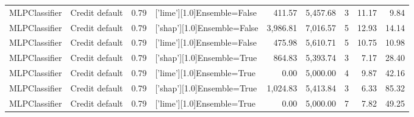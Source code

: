 \begin{tabular}{llrlrrlrr}
MLPClassifier & Credit default &      0.79 & ['lime'][1.0]Ensemble=False &     411.57 &                 5,457.68 &               3 &              11.17 &     9.84 \\
MLPClassifier & Credit default &      0.79 & ['shap'][1.0]Ensemble=False &   3,986.81 &                 7,016.57 &               5 &              12.93 &    14.14 \\
MLPClassifier & Credit default &      0.79 & ['lime'][1.0]Ensemble=False &     475.98 &                 5,610.71 &               5 &              10.75 &    10.98 \\
MLPClassifier & Credit default &      0.79 &  ['shap'][1.0]Ensemble=True &     864.83 &                 5,393.74 &               3 &               7.17 &    28.40 \\
MLPClassifier & Credit default &      0.79 &  ['lime'][1.0]Ensemble=True &       0.00 &                 5,000.00 &               4 &               9.87 &    42.16 \\
MLPClassifier & Credit default &      0.79 &  ['shap'][1.0]Ensemble=True &   1,024.83 &                 5,413.84 &               3 &               6.33 &    85.32 \\
MLPClassifier & Credit default &      0.79 &  ['lime'][1.0]Ensemble=True &       0.00 &                 5,000.00 &               7 &               7.82 &    49.25 \\
\bottomrule
\end{tabular}
